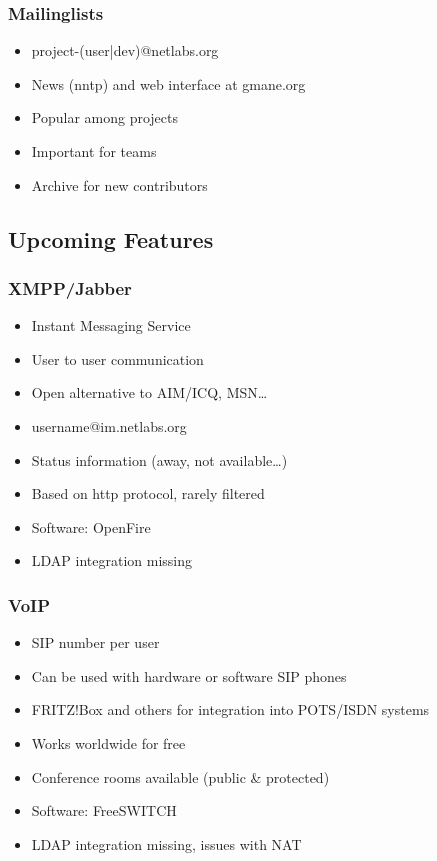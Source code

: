 \documentclass{beamer}
\begin{document}
\begin{frame}
\frametitle{Mailinglists}
\begin{itemize}
  \item project-(user|dev)@netlabs.org
  \item News (nntp) and web interface at gmane.org
  \item Popular among projects
  \item Important for teams
  \item Archive for new contributors
\end{itemize}
\end{frame}

\subsection{Upcoming Features}

\begin{frame}
\frametitle{XMPP/Jabber}
\begin{itemize}
  \item Instant Messaging Service
  \item User to user communication
  \item Open alternative to AIM/ICQ, MSN\ldots
  \item username@im.netlabs.org
  \item Status information (away, not available\ldots)
  \item Based on http protocol, rarely filtered
  \item Software: OpenFire
  \item LDAP integration missing
\end{itemize}
\end{frame}

\begin{frame}
\frametitle{VoIP}
\begin{itemize}
  \item SIP number per user
  \item Can be used with hardware or software SIP phones
  \item FRITZ!Box and others for integration into POTS/ISDN systems
  \item Works worldwide for free
  \item Conference rooms available (public \& protected)
  \item Software: FreeSWITCH
  \item LDAP integration missing, issues with NAT
\end{itemize}
\end{frame}
\end{document}
